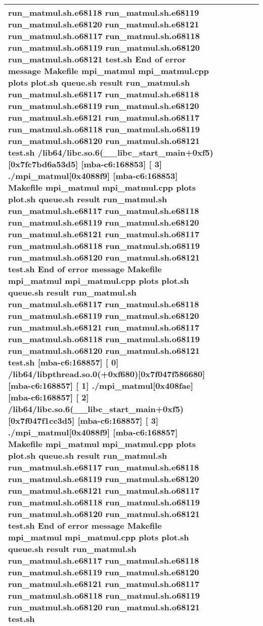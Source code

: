 \documentclass{article}
\begin{document}
\begin{tabular} { | l | l | l | l | l | l | }
run_matmul.sh.e68118 run_matmul.sh.e68119 run_matmul.sh.e68120 run_matmul.sh.e68121 run_matmul.sh.o68117 run_matmul.sh.o68118 run_matmul.sh.o68119 run_matmul.sh.o68120 run_matmul.sh.o68121 test.sh End of error message Makefile mpi_matmul mpi_matmul.cpp plots plot.sh queue.sh result run_matmul.sh run_matmul.sh.e68117 run_matmul.sh.e68118 run_matmul.sh.e68119 run_matmul.sh.e68120 run_matmul.sh.e68121 run_matmul.sh.o68117 run_matmul.sh.o68118 run_matmul.sh.o68119 run_matmul.sh.o68120 run_matmul.sh.o68121 test.sh /lib64/libc.so.6(__libc_start_main+0xf5)[0x7fc7bd6a53d5] [mba-c6:168853] [ 3] ./mpi_matmul[0x4088f9] [mba-c6:168853] Makefile mpi_matmul mpi_matmul.cpp plots plot.sh queue.sh result run_matmul.sh run_matmul.sh.e68117 run_matmul.sh.e68118 run_matmul.sh.e68119 run_matmul.sh.e68120 run_matmul.sh.e68121 run_matmul.sh.o68117 run_matmul.sh.o68118 run_matmul.sh.o68119 run_matmul.sh.o68120 run_matmul.sh.o68121 test.sh End of error message Makefile mpi_matmul mpi_matmul.cpp plots plot.sh queue.sh result run_matmul.sh run_matmul.sh.e68117 run_matmul.sh.e68118 run_matmul.sh.e68119 run_matmul.sh.e68120 run_matmul.sh.e68121 run_matmul.sh.o68117 run_matmul.sh.o68118 run_matmul.sh.o68119 run_matmul.sh.o68120 run_matmul.sh.o68121 test.sh [mba-c6:168857] [ 0] /lib64/libpthread.so.0(+0xf680)[0x7f047f586680] [mba-c6:168857] [ 1] ./mpi_matmul[0x408fae] [mba-c6:168857] [ 2] /lib64/libc.so.6(__libc_start_main+0xf5)[0x7f047f1cc3d5] [mba-c6:168857] [ 3] ./mpi_matmul[0x4088f9] [mba-c6:168857] Makefile mpi_matmul mpi_matmul.cpp plots plot.sh queue.sh result run_matmul.sh run_matmul.sh.e68117 run_matmul.sh.e68118 run_matmul.sh.e68119 run_matmul.sh.e68120 run_matmul.sh.e68121 run_matmul.sh.o68117 run_matmul.sh.o68118 run_matmul.sh.o68119 run_matmul.sh.o68120 run_matmul.sh.o68121 test.sh End of error message Makefile mpi_matmul mpi_matmul.cpp plots plot.sh queue.sh result run_matmul.sh run_matmul.sh.e68117 run_matmul.sh.e68118 run_matmul.sh.e68119 run_matmul.sh.e68120 run_matmul.sh.e68121 run_matmul.sh.o68117 run_matmul.sh.o68118 run_matmul.sh.o68119 run_matmul.sh.o68120 run_matmul.sh.o68121 test.sh \\ \hline

\end{tabular}
\end{document}
